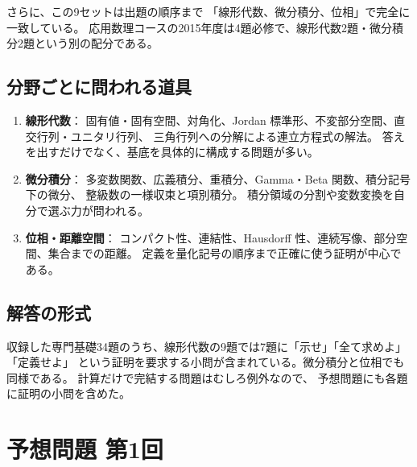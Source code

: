 さらに、この9セットは出題の順序まで
「線形代数、微分積分、位相」で完全に一致している。
応用数理コースの2015年度は4題必修で、線形代数2題・微分積分2題という別の配分である。

\subsection{分野ごとに問われる道具}

\begin{enumerate}
  \item \textbf{線形代数}：
  固有値・固有空間、対角化、Jordan 標準形、不変部分空間、直交行列・ユニタリ行列、
  三角行列への分解による連立方程式の解法。
  答えを出すだけでなく、基底を具体的に構成する問題が多い。
  \item \textbf{微分積分}：
  多変数関数、広義積分、重積分、Gamma・Beta 関数、積分記号下の微分、
  整級数の一様収束と項別積分。
  積分領域の分割や変数変換を自分で選ぶ力が問われる。
  \item \textbf{位相・距離空間}：
  コンパクト性、連結性、Hausdorff 性、連続写像、部分空間、集合までの距離。
  定義を量化記号の順序まで正確に使う証明が中心である。
\end{enumerate}

\subsection{解答の形式}

収録した専門基礎34題のうち、線形代数の9題では7題に「示せ」「全て求めよ」「定義せよ」
という証明を要求する小問が含まれている。微分積分と位相でも同様である。
計算だけで完結する問題はむしろ例外なので、
予想問題にも各題に証明の小問を含めた。

\section{予想問題 第1回}

